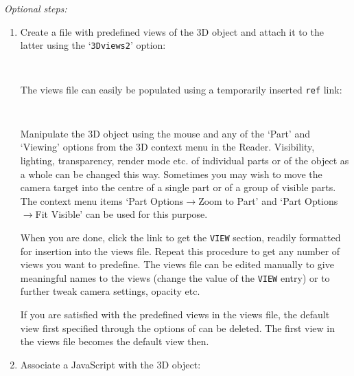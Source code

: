 \documentclass[a4paper]{article}
\begin{document}
\emph{Optional steps:}

\begin{enumerate}
  \setcounter{enumi}{\lastcount}
  \item Create a file with predefined views of the 3D object and attach it to the latter using the `{\tt{}3Dviews2}' option:

  {\tt%
    \string{}\string{\\
    \phantom{xx}.5\string\linewidth\\
    \string}\string{\\
    \phantom{xx}.5\string\linewidth\\
    \string}
  }

  The views file can easily be populated using a temporarily inserted {\tt \string\movie\-ref} link:

  {\tt%
    \string\movieref[3Dgetview]
  }

  Manipulate the 3D object using the mouse and any of the `Part' and `Viewing' options from the 3D context menu in the Reader. Visibility, lighting, transparency, render mode etc. of individual parts or of the object as a whole can be changed this way. Sometimes you may wish to move the camera target into the centre of a single part or of a group of visible parts. The context menu items `Part Options$\rightarrow$Zoom to Part' and `Part Options$\rightarrow$Fit Visible' can be used for this purpose.
  
  When you are done, click the link to get the {\tt VIEW} section, readily formatted for insertion into the views file. Repeat this procedure to get any number of views you want to predefine. The views file can be edited manually to give meaningful names to the views (change the value of the {\tt VIEW} entry) or to further tweak camera settings, opacity etc.

  If you are satisfied with the predefined views in the views file, the default view first specified through the options of {\tt\string{}} can be deleted. The first view in the views file becomes the default view then.

  \item Associate a JavaScript with the 3D object:


\end{enumerate}
\end{document}
